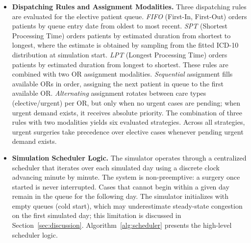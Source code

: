 \documentclass[sn-mathphys-num]{sn-jnl}
\begin{document}
\begin{itemize}
  \item \textbf{Dispatching Rules and Assignment Modalities.}
  Three dispatching rules are evaluated for the elective patient queue.
  \textit{FIFO} (First-In, First-Out) orders patients by queue entry
  date from oldest to most recent. \textit{SPT} (Shortest Processing
  Time) orders patients by estimated duration from shortest to longest,
  where the estimate is obtained by sampling from the fitted ICD-10
  distribution at simulation start. \textit{LPT} (Longest Processing
  Time) orders patients by estimated duration from longest to shortest.
  These rules are combined with two OR assignment modalities.
  \textit{Sequential} assignment fills available ORs in order, assigning
  the next patient in queue to the first available OR.
  \textit{Alternating} assignment rotates between care types
  (elective/urgent) per OR, but only when no urgent cases are pending;
  when urgent demand exists, it receives absolute priority. The
  combination of three rules with two modalities yields six evaluated
  strategies. Across all strategies, urgent surgeries take precedence
  over elective cases whenever pending urgent demand exists.

  \item \textbf{Simulation Scheduler Logic.}
  The simulator operates through a centralized scheduler that iterates
  over each simulated day using a discrete clock advancing minute by
  minute. The system is non-preemptive: a surgery once started is never
  interrupted. Cases that cannot begin within a given day remain in the
  queue for the following day. The simulator initializes with empty
  queues (cold start), which may underestimate steady-state congestion
  on the first simulated day; this limitation is discussed in
  Section~\ref{sec:discussion}. Algorithm~\ref{alg:scheduler} presents
  the high-level scheduler logic.


\end{itemize}
\end{document}
